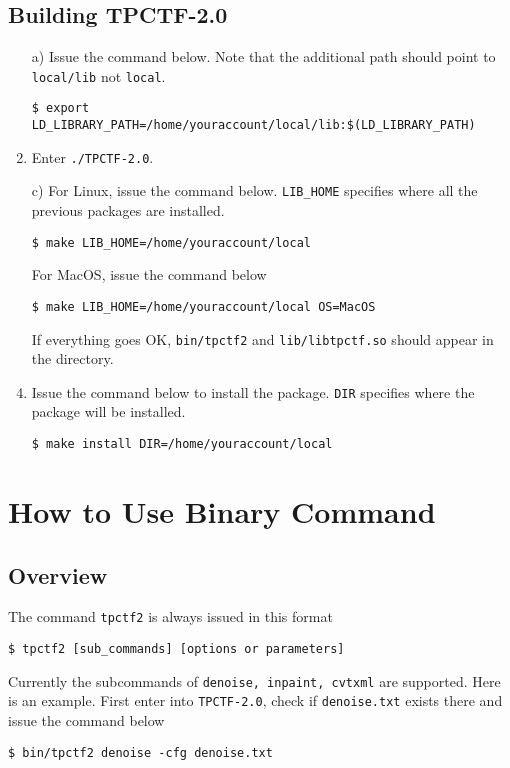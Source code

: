 \documentclass[a4paper,5pt]{article}
\begin{document}
\subsection{Building TPCTF-2.0}
\begin{enumerate}
\item[a)] Issue the command below. Note that the additional path should point to \lstinline{local/lib} not \lstinline{local}.

\lstinline{$ export LD_LIBRARY_PATH=/home/youraccount/local/lib:$(LD_LIBRARY_PATH)}
\item[b)] Enter \lstinline{./TPCTF-2.0}.
\item[c)] For Linux, issue the command below. \lstinline{LIB_HOME} specifies where all the previous packages are installed.

\lstinline{$ make LIB_HOME=/home/youraccount/local}

For MacOS, issue the command below

\lstinline{$ make LIB_HOME=/home/youraccount/local OS=MacOS}

If everything goes OK, \lstinline{bin/tpctf2} and \lstinline{lib/libtpctf.so} should appear in the directory.
\item[d)] Issue the command below to install the package. \lstinline{DIR} specifies where the package will be installed.

\lstinline{$ make install DIR=/home/youraccount/local}

\end{enumerate}


\section{How to Use Binary Command}

\subsection{Overview}

The command \lstinline{tpctf2} is always issued in this format

\lstinline{$ tpctf2 [sub_commands] [options or parameters]}

Currently the subcommands of \lstinline{denoise, inpaint, cvtxml} are supported. Here is an example. First enter into \lstinline{TPCTF-2.0}, check if \lstinline{denoise.txt} exists there and issue the command below

\lstinline{$ bin/tpctf2 denoise -cfg denoise.txt}
\end{document}
